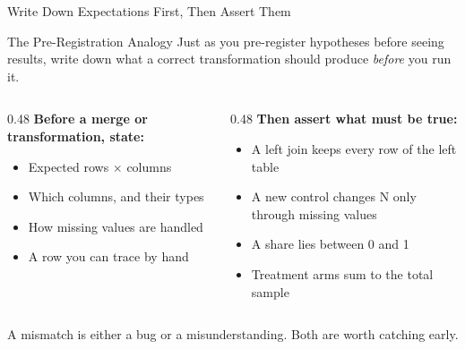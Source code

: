 \documentclass[aspectratio=169, 11pt]{beamer}
\begin{document}
\begin{frame}{Write Down Expectations First, Then Assert Them}
  \begin{block}{The Pre-Registration Analogy}
    Just as you pre-register hypotheses before seeing results, write down what a correct transformation should produce \textit{before} you run it.
  \end{block}

  \vspace{0.2em}
  \begin{columns}[T]
    \begin{column}{0.48\textwidth}
      \textbf{Before a merge or transformation, state:}
      \begin{itemize}
        \small
        \item Expected rows $\times$ columns
        \item Which columns, and their types
        \item How missing values are handled
        \item A row you can trace by hand
      \end{itemize}
    \end{column}
    \begin{column}{0.48\textwidth}
      \textbf{Then assert what must be true:}
      \begin{itemize}
        \small
        \item A left join keeps every row of the left table
        \item A new control changes N only through missing values
        \item A share lies between 0 and 1
        \item Treatment arms sum to the total sample
      \end{itemize}
    \end{column}
  \end{columns}

  \vspace{0.3em}
  {\small A mismatch is either a bug or a misunderstanding. Both are worth catching early.}
\end{frame}
\end{document}
